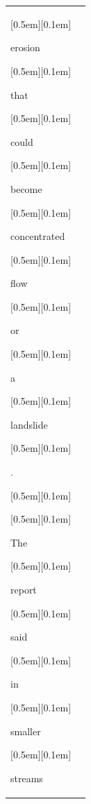 \begin{table}[ht]
\begin{tabular}{@{}l p{13cm}@{}}
{\setlength{\fboxsep}{1pt}\raisebox{0pt}[0.5em][0.1em]{\colorbox{DarkOrchid!25}{\strut{ erosion}}}}{\setlength{\fboxsep}{1pt}\raisebox{0pt}[0.5em][0.1em]{\colorbox{Salmon!60}{\strut{ that}}}}{\setlength{\fboxsep}{1pt}\raisebox{0pt}[0.5em][0.1em]{\colorbox{Salmon!60}{\strut{ could}}}}{\setlength{\fboxsep}{1pt}\raisebox{0pt}[0.5em][0.1em]{\colorbox{SkyBlue!55}{\strut{ become}}}}{\setlength{\fboxsep}{1pt}\raisebox{0pt}[0.5em][0.1em]{\colorbox{Salmon!60}{\strut{ concentrated}}}}{\setlength{\fboxsep}{1pt}\raisebox{0pt}[0.5em][0.1em]{\colorbox{Salmon!60}{\strut{ flow}}}}{\setlength{\fboxsep}{1pt}\raisebox{0pt}[0.5em][0.1em]{\colorbox{SkyBlue!55}{\strut{ or}}}}{\setlength{\fboxsep}{1pt}\raisebox{0pt}[0.5em][0.1em]{\colorbox{SkyBlue!55}{\strut{ a}}}}{\setlength{\fboxsep}{1pt}\raisebox{0pt}[0.5em][0.1em]{\colorbox{Salmon!60}{\strut{ landslide}}}}{\setlength{\fboxsep}{1pt}\raisebox{0pt}[0.5em][0.1em]{\colorbox{DarkOrchid!25}{\strut{.}}}}{\setlength{\fboxsep}{1pt}\raisebox{0pt}[0.5em][0.1em]{\colorbox{DarkOrchid!25}{\strut{ }}}}{\setlength{\fboxsep}{1pt}\raisebox{0pt}[0.5em][0.1em]{\colorbox{DarkOrchid!25}{\strut{The}}}}{\setlength{\fboxsep}{1pt}\raisebox{0pt}[0.5em][0.1em]{\colorbox{DarkOrchid!25}{\strut{ report}}}}{\setlength{\fboxsep}{1pt}\raisebox{0pt}[0.5em][0.1em]{\colorbox{SkyBlue!55}{\strut{ said}}}}{\setlength{\fboxsep}{1pt}\raisebox{0pt}[0.5em][0.1em]{\colorbox{SkyBlue!55}{\strut{ in}}}}{\setlength{\fboxsep}{1pt}\raisebox{0pt}[0.5em][0.1em]{\colorbox{Salmon!60}{\strut{ smaller}}}}{\setlength{\fboxsep}{1pt}\raisebox{0pt}[0.5em][0.1em]{\colorbox{Salmon!60}{\strut{ streams}}}}\\



\end{tabular}
\end{table}
